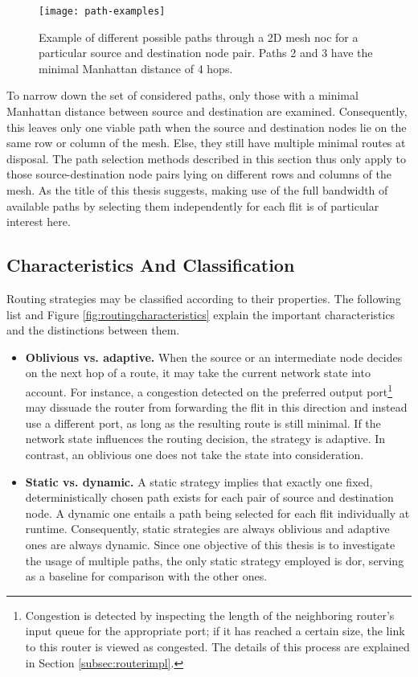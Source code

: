 \begin{figure}
    \centering
    \texttt{[image: path-examples]}
    \caption[Examples of different paths between two nodes]{Example of different possible paths through a 2D mesh \gls{noc} for a particular source
    and destination node pair. Paths 2 and 3 have the minimal Manhattan distance of 4 hops.}
    \label{fig:pathexamples}
\end{figure}

To narrow down the set of considered paths, only those with a minimal Manhattan distance between source and destination are examined. Consequently, this
leaves only one viable path when the source and destination nodes lie on the same row or column of the mesh. Else, they still have multiple minimal
routes at disposal. The path selection methods described in this section thus only apply to those source-destination node pairs lying on different
rows and columns of the mesh. As the title of this thesis suggests, making use of the full bandwidth of available paths by selecting them
independently for each flit is of particular interest here.

\subsection{Characteristics And Classification}\label{subsec:routingclassification}
Routing strategies may be classified according to their properties. The following list and Figure \ref{fig:routingcharacteristics} explain the important
characteristics and the distinctions between them.
\begin{itemize}
    \item \textbf{Oblivious vs. adaptive.} When the source or an intermediate node decides on the next hop of a route, it may take the current
        network state into account. For instance, a congestion detected on the preferred output port\footnote{Congestion is detected by inspecting the
        length of the neighboring router's input queue for the appropriate port; if it has reached a certain size, the link to this router is viewed as congested. The details
        of this process are explained in Section \ref{subsec:routerimpl}.} may dissuade the router from forwarding the flit in this direction and instead
        use a different port, as long as the resulting route is still minimal. If the network state influences the routing decision, the strategy is
        adaptive. In contrast, an oblivious one does not take the state into consideration.
    \item \textbf{Static vs. dynamic.} A static strategy implies that exactly one fixed, deterministically chosen path exists for each pair of source
        and destination node. A dynamic one entails a path being selected for each flit individually at runtime. Consequently, static strategies are
        always oblivious and adaptive ones are always dynamic. Since one objective of this thesis is to investigate the usage of multiple paths, the
        only static strategy employed is \gls{dor}, serving as a baseline for comparison with the other ones.
\end{itemize}
\vspace{0.5\baselineskip}

